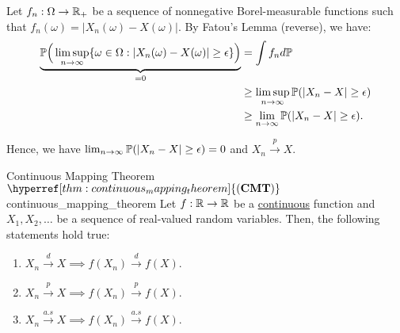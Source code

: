 \begin{proof*}
    Let $f_n:\Omega\to\mathbb{R}_+$ be a sequence of nonnegative Borel-measurable functions such that $f_n(\omega)=|X_n(\omega) - X(\omega)|$. By Fatou's Lemma (reverse), we have:
    \begin{align*}
        \underbrace{\mathbb{P}\Big( \limsup_{n\to\infty} \{\omega\in\Omega:|X_n(\omega) - X(\omega)| \ge \epsilon\} \Big)}_{=0} &= \int f_nd\mathbb{P} \\ 
        &\ge \limsup_{n\to\infty}\mathbb{P}(|X_n - X|\ge\epsilon) \\
        &\ge \lim_{n\to\infty}\mathbb{P}(|X_n - X|\ge\epsilon).
    \end{align*}

    \noindent Hence, we have $\lim_{n\to\infty}\mathbb{P}(|X_n-X|\ge\epsilon)=0$ and $X_n\xrightarrow{p}X$.
\end{proof*}

\newcommand{\CMT}{\hyperref[thm:continuous_mapping_theorem]{(\mathrm{{\bf CMT}})}}
\begin{theorem}{Continuous Mapping Theorem $\CMT$}{continuous_mapping_theorem}
    Let $f:\mathbb{R}\to\mathbb{R}$ be a \underline{continuous} function and $X_1, X_2, \dots$ be a sequence of real-valued random variables. Then, the following statements hold true:
    \begin{enumerate}
        \item $X_n\xrightarrow{d}X \implies   f(X_n)\xrightarrow{d}f(X)$.
        \item $X_n\xrightarrow{p}X \implies   f(X_n)\xrightarrow{p}f(X)$.
        \item $X_n\xrightarrow{a.s}X \implies f(X_n)\xrightarrow{a.s}f(X)$.
    \end{enumerate}
\end{theorem}


